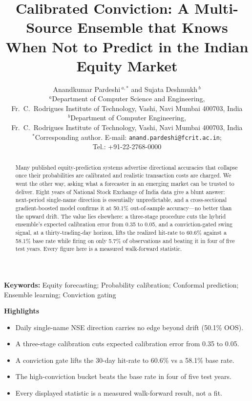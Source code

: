 \documentclass[12pt,a4paper]{article}
\title{\textbf{Calibrated Conviction: A Multi-Source Ensemble that Knows
When Not to Predict in the Indian Equity Market}}
\author{
Anandkumar Pardeshi\,$^{a,*}$ \quad and \quad Sujata Deshmukh\,$^{b}$\\[0.6em]
\small $^{a}$Department of Computer Science and Engineering,\\
\small Fr.\ C.\ Rodrigues Institute of Technology, Vashi, Navi Mumbai 400703, India\\[0.3em]
\small $^{b}$Department of Computer Engineering,\\
\small Fr.\ C.\ Rodrigues Institute of Technology, Vashi, Navi Mumbai 400703, India\\[0.4em]
\small $^{*}$Corresponding author. E-mail: \texttt{anand.pardeshi@fcrit.ac.in};\\
\small Tel.: +91-22-2768-0000
}
\date{}
\begin{document}
\maketitle

\raggedright
\setlength{\parindent}{1.27cm}
\setlength{\parskip}{0pt}
\doublespacing

\begin{abstract}
\normalsize\noindent
Many published equity-prediction systems advertise directional accuracies that
collapse once their probabilities are calibrated and realistic transaction costs
are charged. We went the other way, asking what a forecaster in an emerging market
can be trusted to deliver.
Eight years of National Stock Exchange of India data give a blunt answer:
next-period single-name direction is essentially unpredictable, and a
cross-sectional gradient-boosted model confirms it at 50.1\% out-of-sample
accuracy---no better than the upward drift. The value lies elsewhere:
a three-stage procedure cuts the hybrid ensemble's expected calibration error from
0.35 to 0.05, and a conviction-gated swing signal,
at a thirty-trading-day horizon, lifts the realized hit-rate to 60.6\% against a
58.1\% base rate while firing on only 5.7\% of observations and beating it in four
of five test years. Every figure here is a measured walk-forward statistic.
\end{abstract}

\noindent\textbf{Keywords:} Equity forecasting; Probability calibration;
Conformal prediction; Ensemble learning; Conviction gating

\vspace{0.6em}
\noindent\textbf{Highlights}
\begin{itemize}\setlength{\itemsep}{0pt}
  \item Daily single-name NSE direction carries no edge beyond drift (50.1\% OOS).
  \item A three-stage calibration cuts expected calibration error from 0.35 to 0.05.
  \item A conviction gate lifts the 30-day hit-rate to 60.6\% vs a 58.1\% base rate.
  \item The high-conviction bucket beats the base rate in four of five test years.
  \item Every displayed statistic is a measured walk-forward result, not a fit.
\end{itemize}
\end{document}
